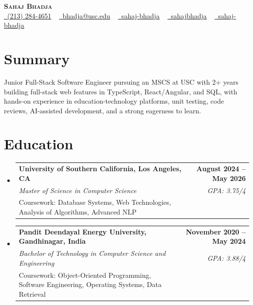 \documentclass[letterpaper,10pt]{article}
\makeatletter
\newcommand{\resumeEduSubheading}[5]{\vspace{-1pt}\item\begin{tabular*}{1.0\textwidth}[t]{l@{\extracolsep{\fill}}r}\textbf{#1} & \textbf{\small #2} \\\textit{\small #3} & \textit{\small #4} \\\small #5 & \\\end{tabular*}\vspace{-4pt}}
\newcommand{\resumeSubHeadingListStart}{\begin{itemize}[leftmargin=0.0in, label={}]}
\newcommand{\resumeSubHeadingListEnd}{\end{itemize}}
\makeatother
\begin{document}
\begin{center}
{\Huge \scshape \textbf{Sahaj Bhadja}} \\ \vspace{1pt}
\small \href{tel:(213) 284-4651}{\faPhone\ \underline{(213) 284-4651}} ~ \href{mailto: bhadja@usc.edu}{\raisebox{-0.2\height}\faEnvelope\ \underline{bhadja@usc.edu}} ~
\href{https://www.linkedin.com/in/sahaj-bhadja/}{\raisebox{-0.2\height}\faLinkedin\ \underline{sahaj-bhadja}} ~ \href{https://github.com/SAHAJ-BHADJA}{\raisebox{-0.2\height}\faGithub\ \underline{sahajbhadja}} ~
\href{https://sahaj-bhadja.vercel.app/}{\raisebox{-0.2\height}\faGlobe\ \underline{sahaj-bhadja}}
\end{center}
\vspace{-16pt}
\section{Summary}
\begin{itemize}[leftmargin=0.15in, label={}]
\small{\item{Junior Full-Stack Software Engineer pursuing an MSCS at USC with 2+ years building full-stack web features in TypeScript, React/Angular, and SQL, with hands-on experience in education-technology platforms, unit testing, code reviews, AI-assisted development, and a strong eagerness to learn.}}
\end{itemize}
\vspace{-6pt}
\section{Education}
\resumeSubHeadingListStart
\resumeEduSubheading{University of Southern California, Los Angeles, CA}{August 2024 -- May 2026}{Master of Science in Computer Science}{GPA: 3.75/4}{Coursework: Database Systems, Web Technologies, Analysis of Algorithms, Advanced NLP}
\vspace{-9pt}
\resumeEduSubheading{Pandit Deendayal Energy University, Gandhinagar, India}{November 2020 -- May 2024}{Bachelor of Technology in Computer Science and Engineering}{GPA: 3.88/4}{Coursework: Object-Oriented Programming, Software Engineering, Operating Systems, Data Retrieval}
\resumeSubHeadingListEnd
\vspace{-6pt}
\end{document}
